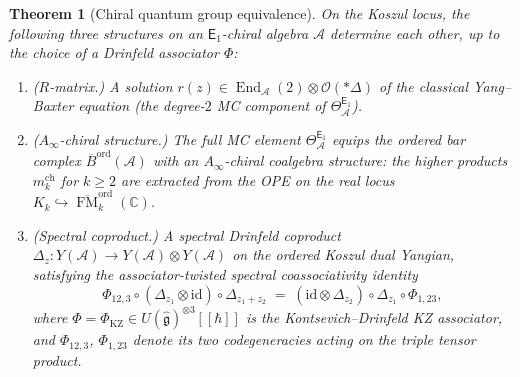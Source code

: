 \documentclass[11pt,reqno]{amsart}
\newtheorem{theorem}{Theorem}[section]
\theoremstyle{definition}
\theoremstyle{remark}
\newcommand{\cA}{\mathcal{A}}
\newcommand{\cO}{\mathcal{O}}
\newcommand{\Ainf}{A_{\infty}}
\newcommand{\Eone}{\mathsf{E}_{1}}
\DeclareMathOperator{\End}{End}
\DeclareMathOperator{\FM}{FM}
\newcommand{\Barord}{\overline{B}^{\mathrm{ord}}}
\newcommand{\CC}{\mathbb{C}}
\newcommand{\id}{\mathrm{id}}
\numberwithin{equation}{section}
\begin{document}
\begin{theorem}[Chiral quantum group equivalence]
\label{thm:chiral-qg-equiv-standalone}
On the Koszul locus, the following three structures on an
$\Eone$-chiral algebra $\cA$ determine each other, up to the
choice of a Drinfeld associator $\Phi$:
\begin{enumerate}[label=\textup{(\Roman*)}]
\item \textup{($R$-matrix.)}
  A solution $r(z) \in \End_\cA(2) \otimes \cO(*\Delta)$ of
  the classical Yang--Baxter equation (the degree-$2$ MC
  component of $\Theta^{\Eone}_\cA$).

\item \textup{($\Ainf$-chiral structure.)}
  The full MC element $\Theta^{\Eone}_\cA$ equips the
  ordered bar complex $\Barord(\cA)$ with an
  $\Ainf$-chiral coalgebra structure: the higher products
  $m_k^{\mathrm{ch}}$ for $k \geq 2$ are extracted from the
  OPE on the real locus
  $K_k \hookrightarrow \overline{\FM}_k^{\mathrm{ord}}(\CC)$.

\item \textup{(Spectral coproduct.)}
  A spectral Drinfeld coproduct
  $\Delta_z\colon Y(\cA) \to Y(\cA) \otimes Y(\cA)$
  on the ordered Koszul dual Yangian, satisfying the
  \emph{associator-twisted} spectral coassociativity identity
  \begin{equation}\label{eq:spectral-coassoc}
    \Phi_{12,3} \circ (\Delta_{z_1} \otimes \id) \circ \Delta_{z_1+z_2}
    \;=\;
    (\id \otimes \Delta_{z_2}) \circ \Delta_{z_1} \circ \Phi_{1,23},
  \end{equation}
  where
  $\Phi = \Phi_{\mathrm{KZ}} \in U(\hat{\mathfrak g})^{\otimes 3}[[\hbar]]$
  is the Kontsevich--Drinfeld KZ associator, and
  $\Phi_{12,3}$, $\Phi_{1,23}$ denote its two codegeneracies
  acting on the triple tensor product.
\end{enumerate}


\end{theorem}
\end{document}
